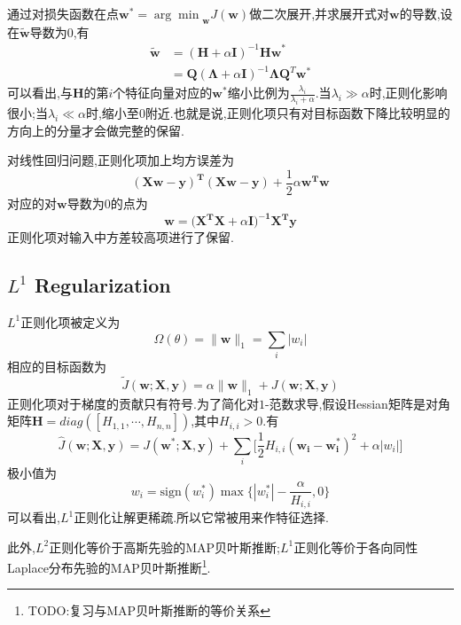 通过对损失函数在点$\mathbf w^\ast={\arg\min}_\mathbf wJ(\mathbf w)$做二次展开,并求展开式对$\mathbf w$的导数,设在$\tilde{\mathbf w}$导数为0,有
\begin{equation}\begin{split}
\tilde{\mathbf w}&=(\mathbf H+\alpha\mathbf I)^{-1}\mathbf{Hw}^\ast\\
&=\mathbf Q(\mathbf\Lambda+\alpha\mathbf I)^{-1}\mathbf\Lambda\mathbf Q^T\mathbf w^\ast
\end{split}\end{equation}
可以看出,与$\mathbf H$的第$i$个特征向量对应的$\mathbf w^\ast$缩小比例为$\frac{\lambda_i}{\lambda_i+\alpha}$.当$\lambda_i\gg\alpha$时,正则化影响很小;当$\lambda_i\ll\alpha$时,缩小至$0$附近.也就是说,正则化项只有对目标函数下降比较明显的方向上的分量才会做完整的保留.

对线性回归问题,正则化项加上均方误差为
\begin{equation}
\mathbf{(Xw-y)^T(Xw-y)}+\frac{1}{2}\alpha\mathbf{w^Tw}
\end{equation}
对应的对$\mathbf w$导数为$0$的点为
\begin{equation}
\mathbf{w=(X^TX}+\alpha\mathbf{I)^{-1}X^Ty}
\end{equation}
正则化项对输入中方差较高项进行了保留.

\subsection{$L^1$ Regularization}

$L^1$正则化项被定义为
\begin{equation}
\Omega(\theta)=\|\mathbf w\|_1=\sum_i|w_i|
\end{equation}
相应的目标函数为
\begin{equation}
\tilde J(\mathbf{w;X,y})=\alpha\|\mathbf w\|_1+J(\mathbf{w;X,y})
\end{equation}
正则化项对于梯度的贡献只有符号.为了简化对$1$-范数求导,假设Hessian矩阵是对角矩阵$\mathbf H=diag([H_{1,1},\cdots,H_{n,n}])$,其中$H_{i,i}>0$.有
\begin{equation}
\hat J(\mathbf{w;X,y})=J(\mathbf{w^\ast;X,y})+\sum_i\Big[\frac{1}{2}H_{i,i}(\mathbf{w_i-w_i^\ast})^2+\alpha|w_i|\Big]
\end{equation}
极小值为
\begin{equation}
w_i=\text{sign}(w_i^\ast)\max\{|w_i^\ast|-\frac{\alpha}{H_{i,i}},0\}
\end{equation}
可以看出,$L^1$正则化让解更稀疏.所以它常被用来作特征选择.

此外,$L^2$正则化等价于高斯先验的MAP贝叶斯推断;$L^1$正则化等价于各向同性Laplace分布先验的MAP贝叶斯推断\footnote{TODO:复习与MAP贝叶斯推断的等价关系}.